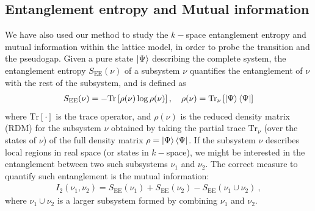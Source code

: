 \documentclass[reprint,hidelinks,onecolumn]{revtex4-2}
\begin{document}
\subsection{Entanglement entropy and Mutual information}
We have also used our method to study the \(k-\)space entanglement entropy and mutual information within the lattice model, in order to probe the transition and the pseudogap. Given a pure state \(\ket{\Psi}\) describing the complete system, the entanglement entropy \(S_\text{EE}(\nu)\) of a subsystem \(\nu\) quantifies the entanglement of \(\nu\) with the rest of the subsystem, and is defined as
\begin{equation}\begin{aligned}
	S_\text{EE}(\nu) = -\text{Tr}\left[\rho(\nu)\log \rho(\nu)\right],\quad \rho(\nu) = \text{Tr}_\nu\left[\ket{\Psi}\bra{\Psi}\right] 
\end{aligned}\end{equation}
where \(\text{Tr}\left[\cdot\right] \) is the trace operator, and \(\rho(\nu)\) is the reduced density matrix (RDM) for the subsystem \(\nu\) obtained by taking the partial trace \(\text{Tr}_\nu\) (over the states of \(\nu\)) of the full density matrix \(\rho = \ket{\Psi}\bra{\Psi}\). If the subsystem \(\nu\) describes local regions in real space (or states in \(k-\)space), we might be interested in the entanglement between two such subsystems \(\nu_1\) and \(\nu_2\). The correct measure to quantify such entanglement is the mutual information:
\begin{equation}\begin{aligned}
	I_2(\nu_1,\nu_2) = S_\text{EE}(\nu_1) + S_\text{EE}(\nu_2) - S_\text{EE}(\nu_1 \cup \nu_2)~,
\end{aligned}\end{equation}
where \(\nu_1 \cup \nu_2\) is a larger subsystem formed by combining \(\nu_1\) and \(\nu_2\).
\end{document}

